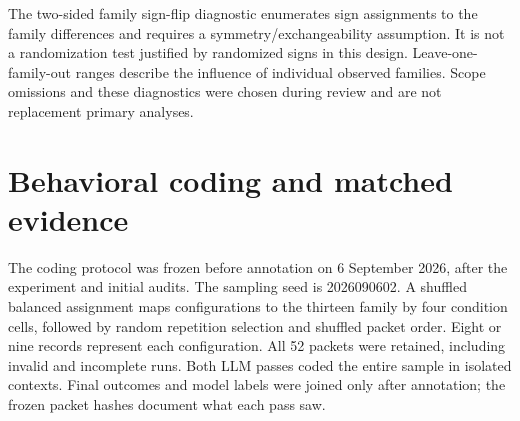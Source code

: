 The two-sided family sign-flip diagnostic enumerates sign assignments to the family differences and requires a symmetry/exchangeability assumption. It is not a randomization test justified by randomized signs in this design. Leave-one-family-out ranges describe the influence of individual observed families. Scope omissions and these diagnostics were chosen during review and are not replacement primary analyses.

\begin{table}[p]
\centering\small
\caption{Exact eligible family sets for the primary and secondary contrasts. Repetitions are averaged within these families.}
\end{table}
\begin{table}[p]
\centering\small
\caption{Uniform family-omission sensitivity analyses for $\Delta U$, in percentage points. The same family omission applies across configurations.}
\end{table}
\begin{table}[p]
\centering\small
\caption{Leave-one-family-out ranges and exact sign-flip diagnostics for corrected $\Delta U$. These are exploratory diagnostics with the assumptions described in the text.}
\end{table}
\begin{table}[p]
\centering\small
\caption{Exploratory C$-$I contrasts with the same complete-family rule and bootstrap procedure. Byte-matched memory envelopes do not ensure equal tokens or semantic content.}
\end{table}

\section{Behavioral coding and matched evidence}
\label{app:behavior}
The coding protocol was frozen before annotation on 6 September 2026, after the experiment and initial audits. The sampling seed is 2026090602. A shuffled balanced assignment maps configurations to the thirteen family by four condition cells, followed by random repetition selection and shuffled packet order. Eight or nine records represent each configuration. All 52 packets were retained, including invalid and incomplete runs. Both LLM passes coded the entire sample in isolated contexts. Final outcomes and model labels were joined only after annotation; the frozen packet hashes document what each pass saw.

